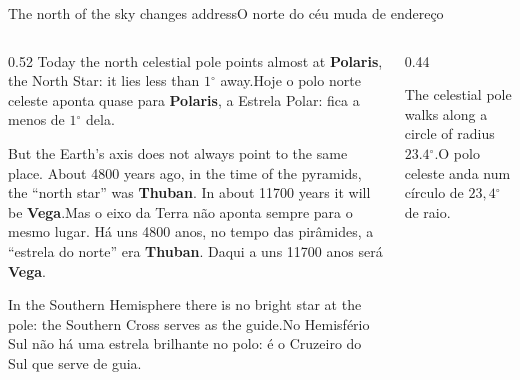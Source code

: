 \documentclass[aspectratio=169,11pt]{beamer}
\newcommand{\tr}[2]{\ifEN#2\else#1\fi}
\newcommand{\bnum}[1]{\textbf{\textcolor{mTeal}{#1}}}
\newcommand{\gr}{\ensuremath{{}^{\circ}}}
\begin{document}
\begin{frame}{\tr{O norte do céu muda de endereço}{The north of the sky changes address}}
  \begin{columns}[T]
    \begin{column}{0.52\textwidth}
      \small
      \tr{Hoje o polo norte celeste aponta quase para \bnum{Polaris}, a Estrela Polar: fica a
      menos de $1\gr$ dela.}{Today the north celestial pole points almost at \bnum{Polaris}, the
      North Star: it lies less than $1\gr$ away.}
      \medskip

      \tr{Mas o eixo da Terra não aponta sempre para o mesmo lugar. Há uns \num{4800} anos, no
      tempo das pirâmides, a ``estrela do norte'' era \bnum{Thuban}. Daqui a uns \num{11700}
      anos será \bnum{Vega}.}{But the Earth's axis does not always point to the same place.
      About \num{4800} years ago, in the time of the pyramids, the ``north star'' was
      \bnum{Thuban}. In about \num{11700} years it will be \bnum{Vega}.}
      \medskip

      \tr{No Hemisfério Sul não há uma estrela brilhante no polo: é o Cruzeiro do Sul que serve
      de guia.}{In the Southern Hemisphere there is no bright star at the pole: the Southern
      Cross serves as the guide.}
    \end{column}
    \begin{column}{0.44\textwidth}
      \centering
      \par\smallskip
      {\scriptsize\textcolor{mStoneMid}{\tr{O polo celeste anda num círculo de $23{,}4\gr$ de
      raio.}{The celestial pole walks along a circle of radius $23.4\gr$.}}}
    \end{column}
  \end{columns}
\end{frame}
\end{document}
